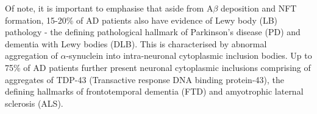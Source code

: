 Of note, it is important to emphasise that aside from A$\beta$ deposition and NFT formation, 15-20\% of AD patients also have evidence of Lewy body (LB) pathology \cite{C1995,L2003} - the defining pathological hallmark of Parkinson's disease (PD)\cite{Wakabayashi2007} and dementia with Lewy bodies (DLB)\cite{Spillantini1997}. This is characterised by abnormal aggregation of $\alpha$-synuclein into intra-neuronal cytoplasmic inclusion bodies. Up to 75\% of AD patients further present neuronal cytoplasmic inclusions comprising of aggregates of TDP-43 \cite{King2010,McAleese2017,Arai2009} (Transactive response DNA binding protein-43), the defining hallmarks of frontotemporal dementia (FTD) and amyotrophic laternal sclerosis\cite{Pesiridis2009} (ALS).


